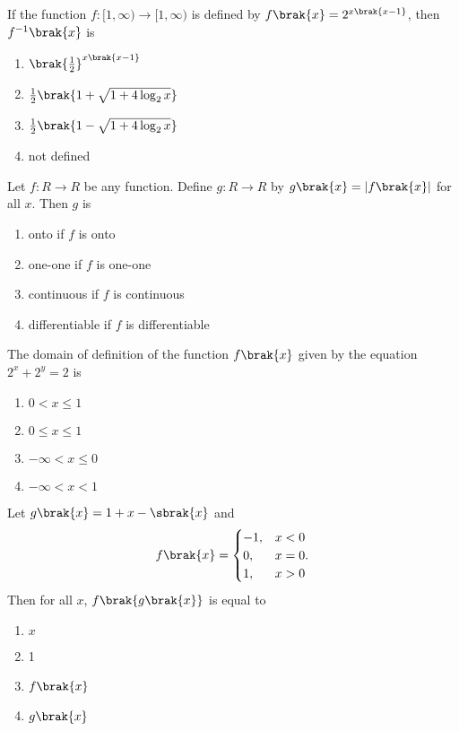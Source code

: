 \item If the function $f:[1,\infty)\to[1,\infty)$ is defined by $f\brak{x}=2^{x\brak{x-1}}$, then $f^{-1}\brak{x}$ is
\hfill{}
\begin{multicols}{2}
	\begin{enumerate}
		\item $\brak{\frac{1}{2}}^{x\brak{x-1}}$ 
		\item $\frac{1}{2}\brak{1+\sqrt{1+4\log_{2}{x}}}$
		\item $\frac{1}{2}\brak{1-\sqrt{1+4\log_{2}{x}}}$ 
		\item not defined
	\end{enumerate}
\end{multicols}

\item Let $f:R\to R$ be any function. Define $g:R\to R$ by $g\brak{x}=|f\brak{x}|$ for all $x$. Then $g$ is
\hfill{}
\begin{enumerate}
\item onto if $f$ is onto
\item one-one if $f$ is one-one
\item continuous if $f$ is continuous
\item differentiable if $f$ is differentiable
\end{enumerate}

\item The domain of definition of the function $f\brak{x}$ given by the equation $2^{x}+2^{y}=2$ is
\hfill{}
\begin{multicols}{2}
	\begin{enumerate}
		\item $0<x\le1$ 
		\item $0\le x\le1$
		\item $-\infty<x\le0$ 
		\item $-\infty<x<1$
	\end{enumerate}
\end{multicols}

\item Let $g\brak{x}=1+x-\sbrak{x}$ and
\begin{equation*}
f\brak{x}=
\begin{cases}
-1, & \text{$x<0$} \\
0, & \text{$x=0$.} \\
1, & \text{$x>0$}
\end{cases}
\end{equation*}
Then for all $x$, $f\brak{g\brak{x}}$ is equal to
\hfill{}
\begin{multicols}{2}
	\begin{enumerate}
		\item $x$ 
		\item 1
		\item $f\brak{x}$ 
		\item $g\brak{x}$
	\end{enumerate}
\end{multicols}

